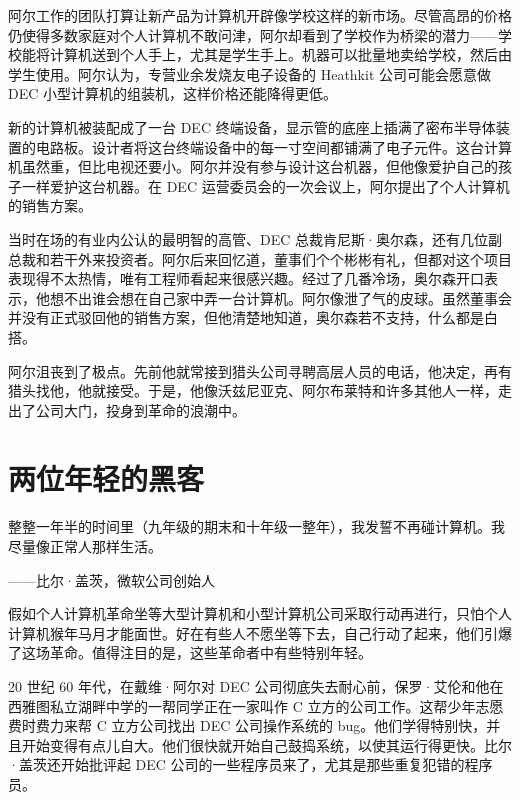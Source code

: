 \documentclass[12pt,UTF8]{ctexbook}
\begin{document}
阿尔工作的团队打算让新产品为计算机开辟像学校这样的新市场。尽管高昂的价格仍使得多数家庭对个人计算机不敢问津，阿尔却看到了学校作为桥梁的潜力——学校能将计算机送到个人手上，尤其是学生手上。机器可以批量地卖给学校，然后由学生使用。阿尔认为，专营业余发烧友电子设备的 Heathkit 公司可能会愿意做 DEC 小型计算机的组装机，这样价格还能降得更低。

新的计算机被装配成了一台 DEC 终端设备，显示管的底座上插满了密布半导体装置的电路板。设计者将这台终端设备中的每一寸空间都铺满了电子元件。这台计算机虽然重，但比电视还要小。阿尔并没有参与设计这台机器，但他像爱护自己的孩子一样爱护这台机器。在 DEC 运营委员会的一次会议上，阿尔提出了个人计算机的销售方案。

当时在场的有业内公认的最明智的高管、DEC 总裁肯尼斯·奥尔森，还有几位副总裁和若干外来投资者。阿尔后来回忆道，董事们个个彬彬有礼，但都对这个项目表现得不太热情，唯有工程师看起来很感兴趣。经过了几番冷场，奥尔森开口表示，他想不出谁会想在自己家中弄一台计算机。阿尔像泄了气的皮球。虽然董事会并没有正式驳回他的销售方案，但他清楚地知道，奥尔森若不支持，什么都是白搭。

阿尔沮丧到了极点。先前他就常接到猎头公司寻聘高层人员的电话，他决定，再有猎头找他，他就接受。于是，他像沃兹尼亚克、阿尔布莱特和许多其他人一样，走出了公司大门，投身到革命的浪潮中。





\section{两位年轻的黑客}


整整一年半的时间里（九年级的期末和十年级一整年），我发誓不再碰计算机。我尽量像正常人那样生活。

——比尔·盖茨，微软公司创始人



假如个人计算机革命坐等大型计算机和小型计算机公司采取行动再进行，只怕个人计算机猴年马月才能面世。好在有些人不愿坐等下去，自己行动了起来，他们引爆了这场革命。值得注目的是，这些革命者中有些特别年轻。

20 世纪 60 年代，在戴维·阿尔对 DEC 公司彻底失去耐心前，保罗·艾伦和他在西雅图私立湖畔中学的一帮同学正在一家叫作 C 立方的公司工作。这帮少年志愿费时费力来帮 C 立方公司找出 DEC 公司操作系统的 bug。他们学得特别快，并且开始变得有点儿自大。他们很快就开始自己鼓捣系统，以使其运行得更快。比尔·盖茨还开始批评起 DEC 公司的一些程序员来了，尤其是那些重复犯错的程序员。
\end{document}
